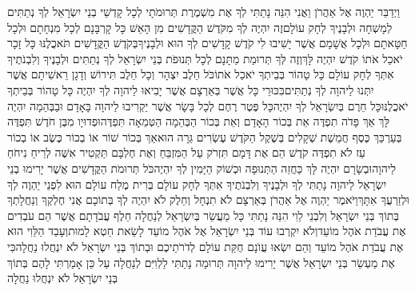 \documentclass[../main/main.tex]{subfiles}
\begin{document}
\begin{multicols*}{\ncols}
וַיְדַבֵּר יַהְוֶה אֶל אַהֲרֹן וַאֲנִי הִנֵּה נָתַתִּי לְךָ אֶת מִשְׁמֶרֶת תְּרוּמֹתָי לְכָל קָדְשֵׁי בְנֵי יִשְׂרָאֵל לְךָ נְתַתִּים לְמָשְׁחָה וּלְבָנֶיךָ לְחָק עוֹלָם\PreVerseSpace{}זֶה יִהְיֶה לְךָ מִקֹּדֶשׁ הַקֳּדָשִׁים מִן הָאֵשׁ כָּל קָרְבָּנָם לְכָל מִנְחָתָם וּלְכָל חַטָּאתָם וּלְכָל אֲשָׁמָם אֲשֶׁר יָשִׁיבוּ לִי קֹדֶשׁ קָדָשִׁים לְךָ הוּא וּלְבָנֶיךָ\PreVerseSpace{}בְּקֹדֶשׁ הַקֳּדָשִׁים תֹּאכֲלֶנּוּ כָּל זָכָר יֹאכַל אֹתוֹ קֹדֶשׁ יִהְיֶה לָּךְ\PreVerseSpace{}וְזֶה לְּךָ תְּרוּמַת מַתָּנָם לְכָל תְּנוּפֹת בְּנֵי יִשְׂרָאֵל לְךָ נְתַתִּים וּלְבָנֶיךָ וְלִבְנֹתֶיךָ אִתְּךָ לְחָק עוֹלָם כָּל טָהוֹר בְּבֵיתְךָ יֹאכַל אֹתוֹ\PreVerseSpace{}כֹּל חֵלֶב יִצְהָר וְכָל חֵלֶב תִּירוֹשׁ וְדָגָן רֵאשִׁיתָם אֲשֶׁר יִתְּנוּ לַיהוָה לְךָ נְתַתִּים\PreVerseSpace{}בִּכּוּרֵי כָּל אֲשֶׁר בְּאַרְצָם אֲשֶׁר יָבִיאוּ לַיהוָה לְךָ יִהְיֶה כָּל טָהוֹר בְּבֵיתְךָ יֹאכֲלֶנּוּ\PreVerseSpace{}כָּל חֵרֶם בְּיִשְׂרָאֵל לְךָ יִהְיֶה\PreVerseSpace{}כָּל פֶּטֶר רֶחֶם לְכָל בָּשָׂר אֲשֶׁר יַקְרִיבוּ לַיהוָה בָּאָדָם וּבַבְּהֵמָה יִהְיֶה לָּךְ אַךְ פָּדֹה תִפְדֶּה אֵת בְּכוֹר הָאָדָם וְאֵת בְּכוֹר הַבְּהֵמָה הַטְּמֵאָה תִּפְדֶּה\PreVerseSpace{}וּפְדוּיָו מִבֶּן חֹדֶשׁ תִּפְדֶּה בְּעַרְכַּךְ\SubEnd{} כֶּסֶף חֲמֵשֶׁת שְׁקָלִים בְּשֶׁקֶל הַקֹּדֶשׁ עֶשְׂרִים גֵּרָה הוּא\PreVerseSpace{}אַךְ בְּכוֹר שׁוֹר אוֹ בְכוֹר כֶּשֶׂב אוֹ בְכוֹר עֵז לֹא תִפְדֶּה קֹדֶשׁ הֵם אֶת דָּמָם תִּזְרֹק עַל הַמִּזְבֵּחַ וְאֶת חֶלְבָּם תַּקְטִיר אִשֶּׁה לְרֵיחַ נִיחֹחַ לַיהוָה\PreVerseSpace{}וּבְשָׂרָם יִהְיֶה לָּךְ כַּחֲזֵה הַתְּנוּפָה וּכְשׁוֹק הַיָּמִין לְךָ יִהְיֶה\PreVerseSpace{}כֹּל תְּרוּמֹת הַקֳּדָשִׁים אֲשֶׁר יָרִימוּ בְנֵי יִשְׂרָאֵל לַיהוָה נָתַתִּי לְךָ וּלְבָנֶיךָ וְלִבְנֹתֶיךָ אִתְּךָ לְחָק עוֹלָם בְּרִית מֶלַח עוֹלָם הוּא לִפְנֵי יַהְוֶה לְךָ וּלְזַרְעֲךָ אִתָּךְ\PreVerseSpace{}וַיֹּאמֶר יַהְוֶה אֶל אַהֲרֹן בְּאַרְצָם לֹא תִנְחָל וְחֵלֶק לֹא יִהְיֶה לְךָ בְּתוֹכָם אֲנִי חֶלְקְךָ וְנַחֲלָתְךָ בְּתוֹךְ בְּנֵי יִשְׂרָאֵל \ClosedSection{}וְלִבְנֵי לֵוִי הִנֵּה נָתַתִּי כָּל מַעֲשֵׂר בְּיִשְׂרָאֵל לְנַחֲלָה חֵלֶף עֲבֹדָתָם אֲשֶׁר הֵם עֹבְדִים אֶת עֲבֹדַת אֹהֶל מוֹעֵד\PreVerseSpace{}וְלֹא יִקְרְבוּ עוֹד בְּנֵי יִשְׂרָאֵל אֶל אֹהֶל מוֹעֵד לָשֵׂאת חֵטְא לָמוּת\PreVerseSpace{}וְעָבַד הַלֵּוִי הוּא אֶת עֲבֹדַת אֹהֶל מוֹעֵד וְהֵם יִשְׂאוּ עֲוֺנָם חֻקַּת עוֹלָם לְדֹרֹתֵיכֶם וּבְתוֹךְ בְּנֵי יִשְׂרָאֵל לֹא יִנְחֲלוּ נַחֲלָה\PreVerseSpace{}כִּי אֶת מַעְשַׂר בְּנֵי יִשְׂרָאֵל אֲשֶׁר יָרִימוּ לַיהוָה תְּרוּמָה נָתַתִּי לַלְוִיִּם לְנַחֲלָה עַל כֵּן אָמַרְתִּי לָהֶם בְּתוֹךְ בְּנֵי יִשְׂרָאֵל לֹא יִנְחֲלוּ נַחֲלָה\OpenSection{}\par

\end{multicols*}
\end{document}
